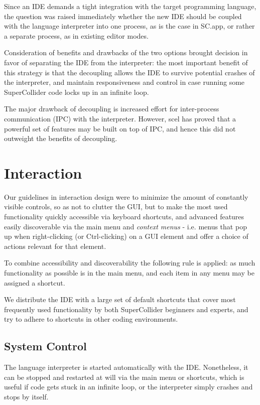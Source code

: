 \documentclass[11pt,a4paper]{article}
\begin{document}
Since an IDE demands a tight integration with the target programming language, the question was
raised immediately whether the new IDE should be coupled with the language interpreter into one
process, as is the case in SC.app, or rather a separate process, as in existing editor modes.

Consideration of benefits and drawbacks of the two options brought decision in favor of
separating the IDE from the interpreter: the most important benefit of this strategy is that the
decoupling allows the IDE to survive potential crashes of the interpreter, and maintain
responsiveness and control in case running some SuperCollider code locks up in an infinite loop.

The major drawback of decoupling is increased effort for inter-process communication (IPC) with the
interpreter. However, scel has proved that a powerful set of features may be built on top of IPC,
and hence this did not outweight the benefits of decoupling.

\section{Interaction}

Our guidelines in interaction design were to minimize the amount of constantly visible controls, so as not to clutter
the GUI, but to make the most used functionality quickly accessible via keyboard shortcuts, and advanced features easily
discoverable via the main menu and \emph{context menus} - i.e. menus that pop up when right-clicking (or Ctrl-clicking)
on a GUI element and offer a choice of actions relevant for that element.

To combine accessibility and discoverability the following rule is applied: as much functionality as possible is
in the main menu, and each item in any menu may be assigned a shortcut.

We distribute the IDE with a large set of default shortcuts that cover most frequently used functionality by both
SuperCollider beginners and experts, and try to adhere to shortcuts in other coding environments.

\subsection{System Control}

The language interpreter is started automatically with the IDE. Nonetheless, it can be stopped and restarted at will
via the main menu or shortcuts, which is useful if code gets stuck in an infinite loop, or the interpreter simply
crashes and stops by itself.
\end{document}
